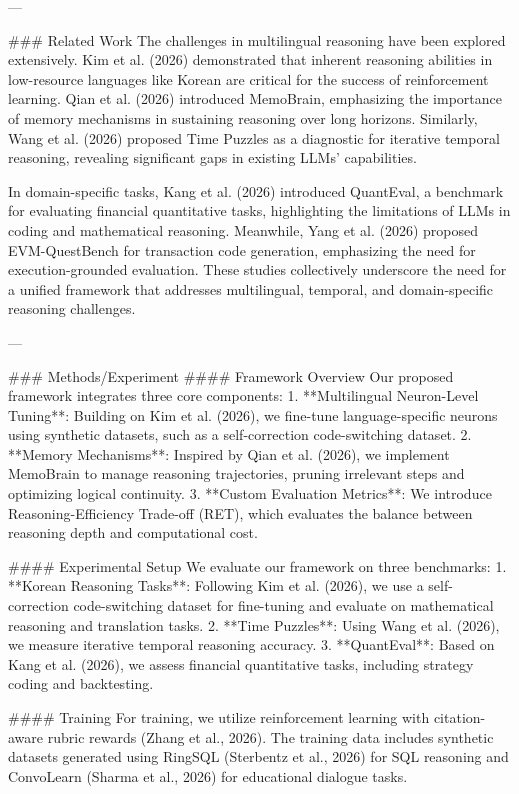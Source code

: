 ---

### Related Work
The challenges in multilingual reasoning have been explored extensively. Kim et al. (2026) demonstrated that inherent reasoning abilities in low-resource languages like Korean are critical for the success of reinforcement learning. Qian et al. (2026) introduced MemoBrain, emphasizing the importance of memory mechanisms in sustaining reasoning over long horizons. Similarly, Wang et al. (2026) proposed Time Puzzles as a diagnostic for iterative temporal reasoning, revealing significant gaps in existing LLMs' capabilities.

In domain-specific tasks, Kang et al. (2026) introduced QuantEval, a benchmark for evaluating financial quantitative tasks, highlighting the limitations of LLMs in coding and mathematical reasoning. Meanwhile, Yang et al. (2026) proposed EVM-QuestBench for transaction code generation, emphasizing the need for execution-grounded evaluation. These studies collectively underscore the need for a unified framework that addresses multilingual, temporal, and domain-specific reasoning challenges.

---

### Methods/Experiment
#### Framework Overview
Our proposed framework integrates three core components:
1. **Multilingual Neuron-Level Tuning**: Building on Kim et al. (2026), we fine-tune language-specific neurons using synthetic datasets, such as a self-correction code-switching dataset.
2. **Memory Mechanisms**: Inspired by Qian et al. (2026), we implement MemoBrain to manage reasoning trajectories, pruning irrelevant steps and optimizing logical continuity.
3. **Custom Evaluation Metrics**: We introduce Reasoning-Efficiency Trade-off (RET), which evaluates the balance between reasoning depth and computational cost.

#### Experimental Setup
We evaluate our framework on three benchmarks:
1. **Korean Reasoning Tasks**: Following Kim et al. (2026), we use a self-correction code-switching dataset for fine-tuning and evaluate on mathematical reasoning and translation tasks.
2. **Time Puzzles**: Using Wang et al. (2026), we measure iterative temporal reasoning accuracy.
3. **QuantEval**: Based on Kang et al. (2026), we assess financial quantitative tasks, including strategy coding and backtesting.

#### Training
For training, we utilize reinforcement learning with citation-aware rubric rewards (Zhang et al., 2026). The training data includes synthetic datasets generated using RingSQL (Sterbentz et al., 2026) for SQL reasoning and ConvoLearn (Sharma et al., 2026) for educational dialogue tasks.

